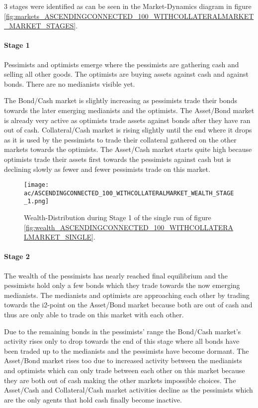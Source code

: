 \documentclass[Bachelorarbeit.tex]{subfiles}
\begin{document}
3 stages were identified as can be seen in the Market-Dynamics diagram in figure \ref{fig:markets_ASCENDINGCONNECTED_100_WITHCOLLATERALMARKET_MARKET_STAGES}.

\paragraph{Stage 1}
Pessimists and optimists emerge where the pessimists are gathering cash and selling all other goods. The optimists are buying assets against cash and against bonds. There are no medianists visible yet.

\medskip
The Bond/Cash market is slightly increasing as pessimists trade their bonds towards the later emerging medianists and the optimists. The Asset/Bond market is already very active as optimists trade assets against bonds after they have ran out of cash. Collateral/Cash market is rising slightly until the end where it drops as it is used by the pessimists to trade their collateral gathered on the other markets towards the optimists. The Asset/Cash market starts quite high because optimists trade their assets first towards the pessimists against cash but is declining slowly as fewer and fewer pessimists trade on this market.

\begin{figure}[H]
	\centering
  \texttt{[image: ac/ASCENDINGCONNECTED\_100\_WITHCOLLATERALMARKET\_WEALTH\_STAGE\_1.png]}
  	\caption{Wealth-Distribution during Stage 1 of the single run of figure \ref{fig:wealth_ASCENDINGCONNECTED_100_WITHCOLLATERALMARKET_SINGLE}.}
	\label{fig:wealth_ASCENDINGCONNECTED_100_WITHCOLLATERALMARKET_WEALTH_STAGE_1}
\end{figure}

\paragraph{Stage 2}
The wealth of the pessimists has nearly reached final equilibrium and the pessimists hold only a few bonds which they trade towards the now emerging medianists. The medianists and optimists are approaching each other by trading towards the i2-point on the Asset/Bond market because both are out of cash and thus are only able to trade on this market with each other.

\medskip
Due to the remaining bonds in the pessimists' range the Bond/Cash market's activity rises only to drop towards the end of this stage where all bonds have been traded up to the medianists and the pessimists have become dormant. The Asset/Bond market rises too due to increased activity between the medianists and optimists which can only trade between each other on this market because they are both out of cash making the other markets impossible choices. The Asset/Cash and Collateral/Cash market activities decline as the pessimists which are the only agents that hold cash finally become inactive.
\end{document}
